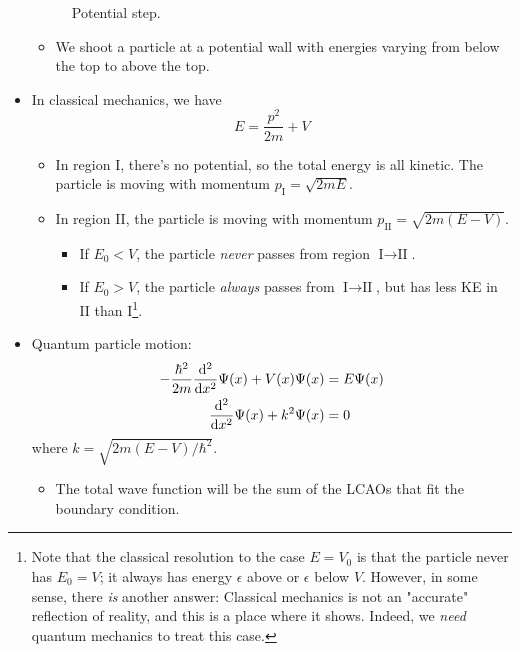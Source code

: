 \documentclass[../notes.tex]{subfiles}
\begin{document}
\begin{itemize}
\begin{figure}[h!]
        \caption{Potential step.}
        \label{fig:potentialStep}
    \end{figure}
    \begin{itemize}
        \item We shoot a particle at a potential wall with energies varying from below the top to above the top.
    \end{itemize}
    \item In classical mechanics, we have
    \begin{equation*}
        E = \frac{p^2}{2m}+V
    \end{equation*}
    \begin{itemize}
        \item In region I, there's no potential, so the total energy is all kinetic. The particle is moving with momentum $p_\text{I}=\sqrt{2mE}$.
        \item In region II, the particle is moving with momentum $p_\text{II}=\sqrt{2m(E-V)}$.
        \begin{itemize}
            \item If $E_0<V$, the particle \emph{never} passes from region $\text{I}\to\text{II}$.
            \item If $E_0>V$, the particle \emph{always} passes from $\text{I}\to\text{II}$, but has less KE in II than I\footnote{Note that the classical resolution to the case $E=V_0$ is that the particle never has $E_0=V$; it always has energy $\epsilon$ above or $\epsilon$ below $V$. However, in some sense, there \emph{is} another answer: Classical mechanics is not an "accurate" reflection of reality, and this is a place where it shows. Indeed, we \emph{need} quantum mechanics to treat this case.}.
        \end{itemize}
    \end{itemize}
    \item Quantum particle motion:
    \begin{align*}
        -\frac{\hbar^2}{2m}\dv[2]{x}\Psi(x)+V(x)\Psi(x) &= E\Psi(x)\\
        \dv[2]{x}\Psi(x)+k^2\Psi(x) &= 0
    \end{align*}
    where $k=\sqrt{2m(E-V)/\hbar^2}$.
    \begin{itemize}
        \item The total wave function will be the sum of the LCAOs that fit the boundary condition.

\end{itemize}
\end{itemize}
\end{document}
